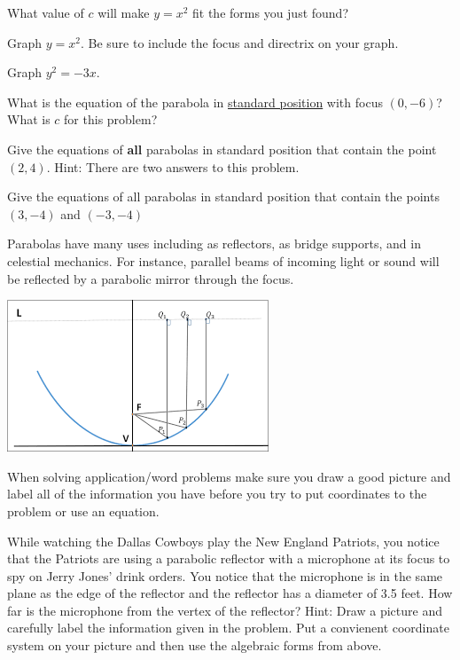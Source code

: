 \bq
\be
\item What value of $c$ will make $y=x^2$ fit the forms you just found?
\item Graph $y=x^2$. Be sure to include the focus and directrix on your graph.
\ee
\eq

\question Graph $y^2=-3x$.

\question What is the equation of the parabola in \underline{standard position} with focus $(0,-6)$? What is $c$ for this problem?

\question Give the equations of \textbf{all} parabolas in standard position that contain the point $(2,4)$. Hint: There are two answers to this problem.

\question Give the equations of all parabolas in standard position that contain the points $(3,-4)$ and $(-3,-4)$

\begin{info} Parabolas have many uses including as reflectors, as bridge supports, and in celestial mechanics. For instance, parallel beams of incoming light or sound will be reflected by a parabolic mirror through the focus.

\begin{center} \includegraphics{parabolic-reflector.png} \end{center}

When solving application/word problems make sure you draw a good picture and label all of the information you have before you try to put coordinates to the problem or use an equation.
\end{info}

\question While watching the Dallas Cowboys play the New England Patriots, you notice that the Patriots are using a parabolic reflector with a microphone at its focus to spy on Jerry Jones' drink orders. You notice that the microphone is in the same plane as the edge of the reflector and the reflector has a diameter of 3.5 feet. How far is the microphone from the vertex of the reflector? Hint: Draw a picture and carefully label the information given in the problem. Put a convienent coordinate system on your picture and then use the algebraic forms from above.

